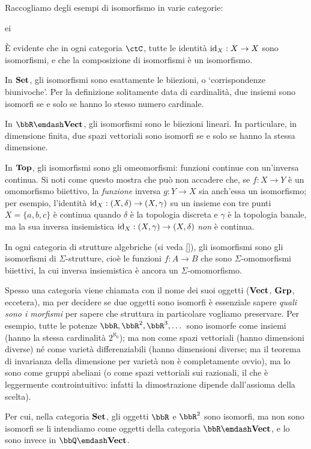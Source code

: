 \begin{examples}
	Raccogliamo degli esempi di isomorfismo in varie categorie:%
	\begin{enumtag}{ei}
		\item \`E evidente che in ogni categoria \(\ctC\), tutte le identità \(\mathrm{id}_X : X\to X\) sono isomorfismi, e che la composizione di isomorfismi è un isomorfismo.
		\item In \(\mathbf{Set}\), gli isomorfismi sono esattamente le biiezioni, o `corrispondenze biunivoche'. Per la definizione solitamente data di cardinalità, due insiemi sono isomorfi se e solo se hanno lo stesso numero cardinale.
		\item In \(\bbR\emdash\ctVect\), gli isomorfismi sono le biiezioni lineari. In particulare, in dimensione finita, due spazi vettoriali sono isomorfi se e solo se hanno la stessa dimensione.
		\item In \(\mathbf{Top}\), gli isomorfismi sono gli omeomorfismi: funzioni continue con un'inversa continua. Si noti come questo mostra che può non accadere che, se \(f : X\to Y\) è un omomorfismo biiettivo, la \emph{funzione} inversa \(g : Y\to X\) sia anch'essa un isomorfismo; per esempio, l'identità \(\mathrm{id}_X : (X,\delta)\to (X,\gamma)\) su un insieme con tre punti \(X=\{a,b,c\}\) è continua quando \(\delta\) è la topologia discreta e \(\gamma\) è la topologia banale, ma la sua inversa insiemistica \(\mathrm{id}_X : (X,\gamma)\to(X,\delta)\) \emph{non} è continua.
		\item In ogni categoria di strutture algebriche (si veda \autoref{}), gli isomorfismi sono gli isomorfismi di \(\Sigma\)-strutture, cioè le funzioni \(f : A\to B\) che sono \(\Sigma\)-omomorfismi biiettivi, la cui inversa insiemistica è ancora un \(\Sigma\)-omomorfismo.
	\end{enumtag}
\end{examples}
\begin{warning}
	Spesso una categoria viene chiamata con il nome dei suoi oggetti (\(\mathbf{Vect}\), \(\mathbf{Grp}\), eccetera), ma per decidere se due oggetti sono isomorfi è essenziale sapere \emph{quali sono i morfismi} per sapere che struttura in particolare vogliamo preservare. Per esempio, tutte le potenze \(\bbR,\bbR^2,\bbR^3,\dots\) sono isomorfe come insiemi (hanno la stessa cardinalità \(2^{\aleph_0}\)); ma non come spazi vettoriali (hanno dimensioni diverse) né come varietà differenziabili (hanno dimensioni diverse; ma il teorema di invarianza della dimensione per varietà non è completamente ovvio), ma lo sono come gruppi abeliani (o come spazi vettoriali sui razionali, il che è leggermente controintuitivo: infatti la dimostrazione dipende dall'assioma della scelta).

	Per cui, nella categoria \(\mathbf{Set}\), gli oggetti \(\bbR\) e \(\bbR^2\) sono isomorfi, ma non sono isomorfi se li intendiamo come oggetti della categoria \(\bbR\emdash\ctVect\), e lo sono invece in \(\bbQ\emdash\ctVect\).
\end{warning}
